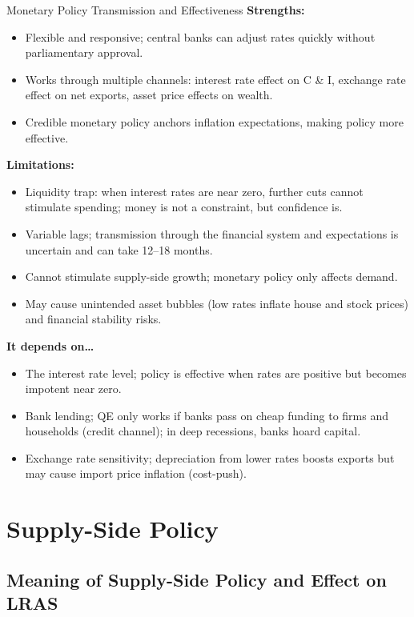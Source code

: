\documentclass[11pt, a4paper, twoside]{book}
\begin{document}
\begin{evaluation}{Monetary Policy Transmission and Effectiveness}
\textbf{Strengths:}
\begin{itemize}[leftmargin=*, nosep]
\item Flexible and responsive; central banks can adjust rates quickly without parliamentary approval.
\item Works through multiple channels: interest rate effect on C \& I, exchange rate effect on net exports, asset price effects on wealth.
\item Credible monetary policy anchors inflation expectations, making policy more effective.
\end{itemize}
\textbf{Limitations:}
\begin{itemize}[leftmargin=*, nosep]
\item Liquidity trap: when interest rates are near zero, further cuts cannot stimulate spending; money is not a constraint, but confidence is.
\item Variable lags; transmission through the financial system and expectations is uncertain and can take 12--18 months.
\item Cannot stimulate supply-side growth; monetary policy only affects demand.
\item May cause unintended asset bubbles (low rates inflate house and stock prices) and financial stability risks.
\end{itemize}
\textbf{It depends on\ldots}
\begin{itemize}[leftmargin=*, nosep]
\item The interest rate level; policy is effective when rates are positive but becomes impotent near zero.
\item Bank lending; QE only works if banks pass on cheap funding to firms and households (credit channel); in deep recessions, banks hoard capital.
\item Exchange rate sensitivity; depreciation from lower rates boosts exports but may cause import price inflation (cost-push).
\end{itemize}
\end{evaluation}

\section{Supply-Side Policy}

\subsection{Meaning of Supply-Side Policy and Effect on LRAS}
\end{document}
